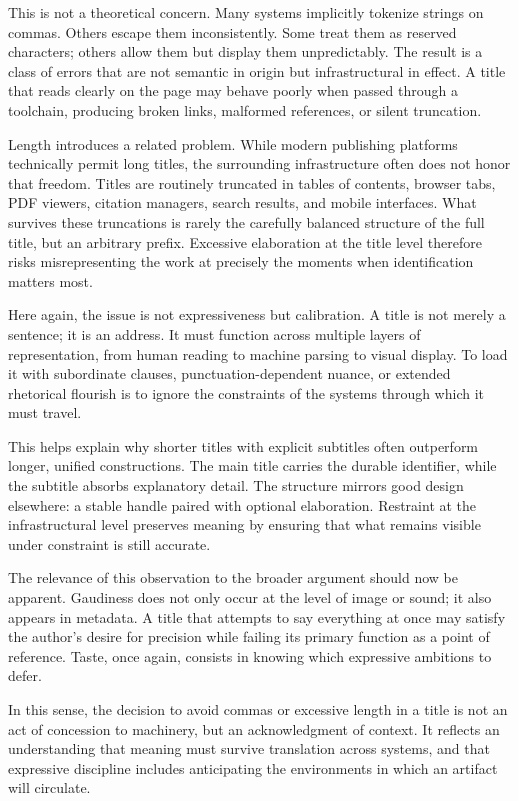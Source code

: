 \documentclass[12pt]{article}
\begin{document}
This is not a theoretical concern. Many systems implicitly tokenize strings on commas. Others escape them inconsistently. Some treat them as reserved characters; others allow them but display them unpredictably. The result is a class of errors that are not semantic in origin but infrastructural in effect. A title that reads clearly on the page may behave poorly when passed through a toolchain, producing broken links, malformed references, or silent truncation.

Length introduces a related problem. While modern publishing platforms technically permit long titles, the surrounding infrastructure often does not honor that freedom. Titles are routinely truncated in tables of contents, browser tabs, PDF viewers, citation managers, search results, and mobile interfaces. What survives these truncations is rarely the carefully balanced structure of the full title, but an arbitrary prefix. Excessive elaboration at the title level therefore risks misrepresenting the work at precisely the moments when identification matters most.

Here again, the issue is not expressiveness but calibration. A title is not merely a sentence; it is an address. It must function across multiple layers of representation, from human reading to machine parsing to visual display. To load it with subordinate clauses, punctuation-dependent nuance, or extended rhetorical flourish is to ignore the constraints of the systems through which it must travel.

This helps explain why shorter titles with explicit subtitles often outperform longer, unified constructions. The main title carries the durable identifier, while the subtitle absorbs explanatory detail. The structure mirrors good design elsewhere: a stable handle paired with optional elaboration. Restraint at the infrastructural level preserves meaning by ensuring that what remains visible under constraint is still accurate.

The relevance of this observation to the broader argument should now be apparent. Gaudiness does not only occur at the level of image or sound; it also appears in metadata. A title that attempts to say everything at once may satisfy the author’s desire for precision while failing its primary function as a point of reference. Taste, once again, consists in knowing which expressive ambitions to defer.

In this sense, the decision to avoid commas or excessive length in a title is not an act of concession to machinery, but an acknowledgment of context. It reflects an understanding that meaning must survive translation across systems, and that expressive discipline includes anticipating the environments in which an artifact will circulate.
\end{document}
